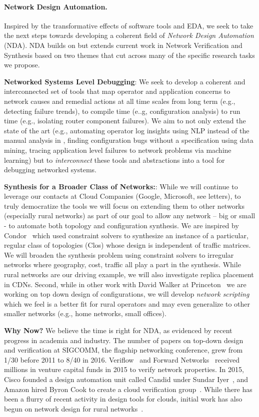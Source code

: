 \paragraph*{Network Design Automation.}
%
Inspired by the transformative effects of software tools and EDA, we seek to take the next steps towards developing a coherent field of {\em Network Design Automation} (NDA). NDA
builds on but extends current work in Network Verification and Synthesis based on two
themes that cut across many of the specific research tasks we propose.

{\bf Networked Systems Level Debugging}:  We seek to develop a coherent and interconnected set of tools that map operator and application concerns  to network causes and remedial actions at all time scales from  long term (e.g., detecting failure trends), to compile time (e..g,
configuration analysis) to run time (e.g., isolating router component failures).  We aim to
not only extend the state of the art  (e.g., automating operator log insights using NLP instead of
the manual analysis in \cite{rameshgoogle}, finding configuration bugs without a specification
using data mining, tracing application level failures to network problems via machine learning)
but to \emph{interconnect} these tools and abstractions into a tool for debugging networked
systems.

{\bf Synthesis for a Broader Class of Networks:}: While we will continue to leverage our contacts at Cloud Companies (Google, Microsoft, see letters), to truly democratize the tools we will focus on extending them to other networks (especially rural networks) as part of our goal to allow any network -- big or small - to automate both topology and configuration synthesis.
We are inspired by Condor~\cite{condor} which used constraint solvers to synthesize an instance of a particular, regular class of topologies (Clos) whose design is independent of traffic matrices.   We will broaden the synthesis problem using constraint solvers to irregular networks where geography, cost, traffic all play a part in the synthesis. While rural networks are our driving example, we will also investigate replica placement in CDNs. Second, while in other
work with David Walker at Princeton~\cite{butane} we are working on top down design of
configurations, we will develop \emph{network scripting} which we feel is a better fit for rural operators and may even generalize to other smaller networks (e.g., home networks, small offices).

{\bf Why Now?} We believe the time is right for NDA, as evidenced by recent progress in academia and industry.  The number of papers on top-down design and verification at SIGCOMM, the flagship networking conference, grew from 1/30 before 2011 to 8/40 in 2016. Veriflow~\cite{veriflow} and Forward Networks~\cite{forward} received millions in venture capital funds in 2015 to verify network properties. In 2015, Cisco founded a design automation unit called Candid under Sundar Iyer~\cite{sundar}, and Amazon hired Byron Cook to create a cloud verification group~\cite{byron}.  While there has been a flurry of recent activity in
design tools for clouds, initial work has also begun on network design for rural
networks~\cite{barath}.




